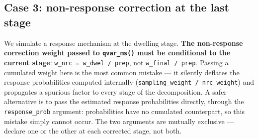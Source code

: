 \documentclass[
]{article}
\newenvironment{Shaded}{\begin{snugshade}}{\end{snugshade}}
\newcommand{\CommentTok}[1]{\textcolor[rgb]{0.56,0.35,0.01}{\textit{#1}}}
\newcommand{\DecValTok}[1]{\textcolor[rgb]{0.00,0.00,0.81}{#1}}
\newcommand{\FloatTok}[1]{\textcolor[rgb]{0.00,0.00,0.81}{#1}}
\newcommand{\FunctionTok}[1]{\textcolor[rgb]{0.13,0.29,0.53}{\textbf{#1}}}
\newcommand{\NormalTok}[1]{#1}
\newcommand{\OtherTok}[1]{\textcolor[rgb]{0.56,0.35,0.01}{#1}}
\newcommand{\SpecialCharTok}[1]{\textcolor[rgb]{0.81,0.36,0.00}{\textbf{#1}}}
\begin{document}
\subsection{Case 3: non-response correction at the last
stage}\label{case-3-non-response-correction-at-the-last-stage}

We simulate a response mechanism at the dwelling stage. \textbf{The
non-response correction weight passed to \texttt{qvar\_ms()} must be
conditional to the current stage}: \texttt{w\_nrc\ =\ w\_dwel\ /\ prep},
not \texttt{w\_final\ /\ prep}. Passing a cumulated weight here is the
most common mistake --- it silently deflates the response probabilities
computed internally (\texttt{sampling\_weight\ /\ nrc\_weight}) and
propagates a spurious factor to every stage of the decomposition. A
safer alternative is to pass the estimated response probabilities
directly, through the \texttt{response\_prob} argument: probabilities
have no cumulated counterpart, so this mistake simply cannot occur. The
two arguments are mutually exclusive --- declare one or the other at
each corrected stage, not both.

\begin{Shaded}
\end{Shaded}
\end{document}
